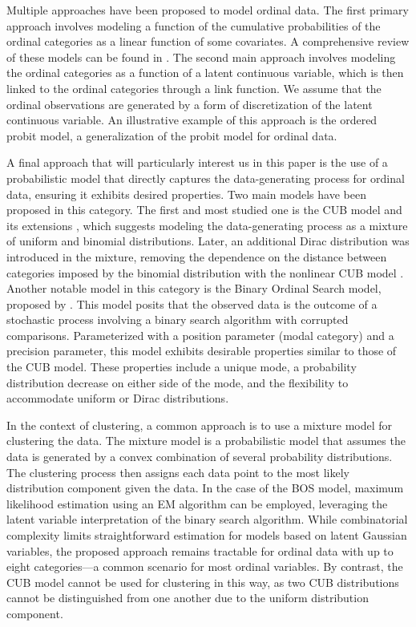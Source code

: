 Multiple approaches have been proposed to model ordinal data. The first primary approach involves modeling a function of the cumulative probabilities of the ordinal categories as a linear function of some covariates. A comprehensive review of these models can be found in \cite{agresti2010analysis}. The second main approach involves modeling the ordinal categories as a function of a latent continuous variable, which is then linked to the ordinal categories through a link function. We assume that the ordinal observations are generated by a form of discretization of the latent continuous variable. An illustrative example of this approach is the ordered probit model, a generalization of the probit model for ordinal data.

A final approach that will particularly interest us in this paper is the use of a probabilistic model that directly captures the data-generating process for ordinal data, ensuring it exhibits desired properties. Two main models have been proposed in this category. The first and most studied one is the CUB model and its extensions \citep{d2005mixture}, which suggests modeling the data-generating process as a mixture of uniform and binomial distributions. Later, an additional Dirac distribution was introduced in the mixture, removing the dependence on the distance between categories imposed by the binomial distribution with the nonlinear CUB model \citep{manisera2014modeling}.
Another notable model in this category is the Binary Ordinal Search model, proposed by \cite{biernacki2016model}. This model posits that the observed data is the outcome of a stochastic process involving a binary search algorithm with corrupted comparisons. Parameterized with a position parameter (modal category) and a precision parameter, this model exhibits desirable properties similar to those of the CUB model. These properties include a unique mode, a probability distribution decrease on either side of the mode, and the flexibility to accommodate uniform or Dirac distributions.

In the context of clustering, a common approach is to use a mixture model for clustering the data. The mixture model is a probabilistic model that assumes the data is generated by a convex combination of several probability distributions. The clustering process then assigns each data point to the most likely distribution component given the data. In the case of the BOS model, maximum likelihood estimation using an EM algorithm can be employed, leveraging the latent variable interpretation of the binary search algorithm. While combinatorial complexity limits straightforward estimation for models based on latent Gaussian variables, the proposed approach remains tractable for ordinal data with up to eight categories—a common scenario for most ordinal variables. By contrast, the CUB model cannot be used for clustering in this way, as two CUB distributions cannot be distinguished from one another due to the uniform distribution component.


